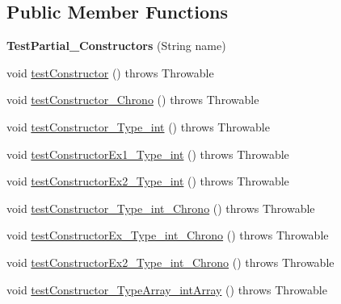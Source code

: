 \subsection*{Public Member Functions}
\begin{DoxyCompactItemize}
\item 
\hypertarget{classorg_1_1joda_1_1time_1_1_test_partial___constructors_af966ce59f7058cb17de15c0fcd7185e2}{{\bfseries Test\-Partial\-\_\-\-Constructors} (String name)}\label{classorg_1_1joda_1_1time_1_1_test_partial___constructors_af966ce59f7058cb17de15c0fcd7185e2}

\item 
void \hyperlink{classorg_1_1joda_1_1time_1_1_test_partial___constructors_af03e24b1c539ccbb411f8485318bcce7}{test\-Constructor} ()  throws Throwable 
\item 
void \hyperlink{classorg_1_1joda_1_1time_1_1_test_partial___constructors_a69cf0a8e119cb400cdf486cace124bfc}{test\-Constructor\-\_\-\-Chrono} ()  throws Throwable 
\item 
void \hyperlink{classorg_1_1joda_1_1time_1_1_test_partial___constructors_a89c24842a45479f1ac0de1196aa9a9ca}{test\-Constructor\-\_\-\-Type\-\_\-int} ()  throws Throwable 
\item 
void \hyperlink{classorg_1_1joda_1_1time_1_1_test_partial___constructors_aade6dc877129569fd36be8263e80e8b7}{test\-Constructor\-Ex1\-\_\-\-Type\-\_\-int} ()  throws Throwable 
\item 
void \hyperlink{classorg_1_1joda_1_1time_1_1_test_partial___constructors_a9a31e1bc24a39035be693b6f30ee4743}{test\-Constructor\-Ex2\-\_\-\-Type\-\_\-int} ()  throws Throwable 
\item 
void \hyperlink{classorg_1_1joda_1_1time_1_1_test_partial___constructors_ae1c7b5239f3eb7113a02a415a5933381}{test\-Constructor\-\_\-\-Type\-\_\-int\-\_\-\-Chrono} ()  throws Throwable 
\item 
void \hyperlink{classorg_1_1joda_1_1time_1_1_test_partial___constructors_af57b49d87e8d9aaec4dc06392c2d4ddb}{test\-Constructor\-Ex\-\_\-\-Type\-\_\-int\-\_\-\-Chrono} ()  throws Throwable 
\item 
void \hyperlink{classorg_1_1joda_1_1time_1_1_test_partial___constructors_a4773a8cc31b0efb3a8cdfab3fc616649}{test\-Constructor\-Ex2\-\_\-\-Type\-\_\-int\-\_\-\-Chrono} ()  throws Throwable 
\item 
void \hyperlink{classorg_1_1joda_1_1time_1_1_test_partial___constructors_a33d3edef22ab8b27191fd592cae355be}{test\-Constructor\-\_\-\-Type\-Array\-\_\-int\-Array} ()  throws Throwable 

\end{DoxyCompactItemize}
